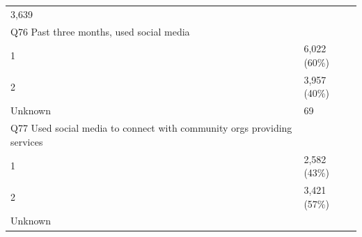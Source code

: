 \documentclass[]{article}
\begin{document}
\begin{longtable}[]{@{}ll@{}}
\begin{minipage}[t]{0.23\columnwidth}
3,639\strut
\end{minipage}\tabularnewline
\begin{minipage}[t]{0.71\columnwidth}\raggedright
Q76 Past three months, used social media\strut
\end{minipage} & \begin{minipage}[t]{0.23\columnwidth}\raggedright
\strut
\end{minipage}\tabularnewline
\begin{minipage}[t]{0.71\columnwidth}\raggedright
1\strut
\end{minipage} & \begin{minipage}[t]{0.23\columnwidth}\raggedright
6,022 (60\%)\strut
\end{minipage}\tabularnewline
\begin{minipage}[t]{0.71\columnwidth}\raggedright
2\strut
\end{minipage} & \begin{minipage}[t]{0.23\columnwidth}\raggedright
3,957 (40\%)\strut
\end{minipage}\tabularnewline
\begin{minipage}[t]{0.71\columnwidth}\raggedright
Unknown\strut
\end{minipage} & \begin{minipage}[t]{0.23\columnwidth}\raggedright
69\strut
\end{minipage}\tabularnewline
\begin{minipage}[t]{0.71\columnwidth}\raggedright
Q77 Used social media to connect with community orgs providing
services\strut
\end{minipage} & \begin{minipage}[t]{0.23\columnwidth}\raggedright
\strut
\end{minipage}\tabularnewline
\begin{minipage}[t]{0.71\columnwidth}\raggedright
1\strut
\end{minipage} & \begin{minipage}[t]{0.23\columnwidth}\raggedright
2,582 (43\%)\strut
\end{minipage}\tabularnewline
\begin{minipage}[t]{0.71\columnwidth}\raggedright
2\strut
\end{minipage} & \begin{minipage}[t]{0.23\columnwidth}\raggedright
3,421 (57\%)\strut
\end{minipage}\tabularnewline
\begin{minipage}[t]{0.71\columnwidth}\raggedright
Unknown\strut

\end{minipage}
\end{longtable}
\end{document}
